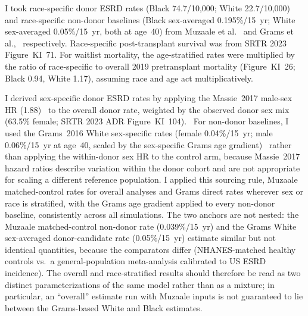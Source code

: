 I took race-specific donor ESRD rates (Black 74.7/10,000; White 22.7/10,000) and race-specific non-donor baselines (Black sex-averaged 0.195\%/15~yr; White sex-averaged 0.05\%/15~yr, both at age~40) from Muzaale et al.~\cite{muzaale_risk_2014} and Grams et al.,~\cite{grams_kidney-failure_2016} respectively. Race-specific post-transplant survival was from SRTR 2023 Figure~KI~71. For waitlist mortality, the age-stratified rates were multiplied by the ratio of race-specific to overall 2019 pretransplant mortality (Figure~KI~26; Black 0.94, White 1.17), assuming race and age act multiplicatively.~\cite{srtr_2023}

I derived sex-specific donor ESRD rates by applying the Massie~2017 male-sex HR (1.88)~\cite{massie_quantifying_2017} to the overall donor rate, weighted by the observed donor sex mix (63.5\% female; SRTR 2023 ADR Figure~KI~104).~\cite{srtr_2023} For non-donor baselines, I used the Grams~2016 White sex-specific rates (female 0.04\%/15~yr; male 0.06\%/15~yr at age~40, scaled by the sex-specific Grams age gradient)~\cite{grams_kidney-failure_2016} rather than applying the within-donor sex HR to the control arm, because Massie~2017 hazard ratios describe variation within the donor cohort and are not appropriate for scaling a different reference population. I applied this sourcing rule, Muzaale matched-control rates for overall analyses and Grams direct rates wherever sex or race is stratified, with the Grams age gradient applied to every non-donor baseline, consistently across all simulations. The two anchors are not nested: the Muzaale matched-control non-donor rate (0.039\%/15~yr) and the Grams White sex-averaged donor-candidate rate (0.05\%/15~yr) estimate similar but not identical quantities, because the comparators differ (NHANES-matched healthy controls vs.\ a general-population meta-analysis calibrated to US ESRD incidence). The overall and race-stratified results should therefore be read as two distinct parameterizations of the same model rather than as a mixture; in particular, an ``overall'' estimate run with Muzaale inputs is not guaranteed to lie between the Grams-based White and Black estimates.

